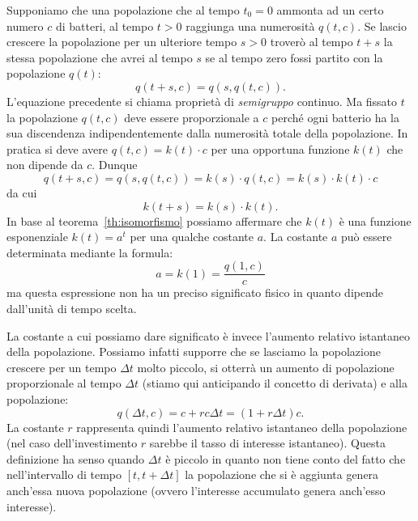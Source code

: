 Supponiamo che una popolazione che al tempo $t_0=0$
ammonta ad un certo numero $c$ di batteri, al tempo
$t>0$ raggiunga una numerosità $q(t,c)$.
Se lascio crescere la popolazione per un ulteriore
tempo $s>0$ troverò al tempo $t+s$ la stessa
popolazione che avrei al tempo $s$ se al tempo
zero fossi partito con la popolazione $q(t)$:
\[
  q(t+s,c) = q(s,q(t,c)).
\]
L'equazione precedente si chiama proprietà
di \emph{semigruppo}
%
continuo.
Ma fissato $t$ la popolazione $q(t,c)$ deve
essere proporzionale a $c$ perché ogni batterio
ha la sua discendenza indipendentemente dalla numerosità
totale della popolazione. In pratica
si deve avere $q(t,c) = k(t) \cdot c$ per una opportuna
funzione $k(t)$ che non dipende da $c$.
Dunque
\[
  q(t+s,c)
  = q(s,q(t,c))
  = k(s) \cdot q(t,c)
  = k(s) \cdot k(t) \cdot c
\]
da cui
\[
  k(t+s) = k(s) \cdot k(t).
\]
In base al teorema~\ref{th:isomorfismo}
possiamo affermare
che $k(t)$ è una funzione esponenziale $k(t)=a^t$
per una qualche costante $a$.
La costante $a$ può essere determinata mediante la formula:
\[
  a = k(1) = \frac{q(1,c)}{c}
\]
ma questa espressione non ha un preciso significato fisico in quanto
dipende dall'unità di tempo scelta.

La costante a cui possiamo dare significato è invece l'aumento relativo
istantaneo della popolazione. Possiamo infatti supporre che
se lasciamo la popolazione crescere per un tempo $\Delta t$ molto piccolo,
si otterrà un aumento di popolazione proporzionale al tempo $\Delta t$
(stiamo qui anticipando il concetto di derivata) e alla popolazione:
\begin{equation}\label{eq:488464}
  q(\Delta t,c) = c + r c \Delta t = (1+r \Delta t) c.
\end{equation}
La costante $r$ rappresenta quindi l'aumento
relativo istantaneo della popolazione (nel caso dell'investimento
$r$ sarebbe il tasso di interesse istantaneo).
Questa definizione ha senso
quando $\Delta t$ è piccolo in quanto non tiene conto del fatto che
nell'intervallo di tempo $[t,t+\Delta t]$ la popolazione che si
è aggiunta genera anch'essa nuova popolazione (ovvero l'interesse
accumulato genera anch'esso interesse).

